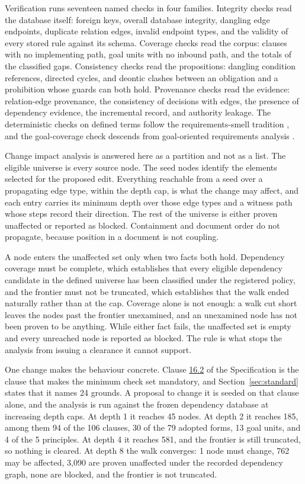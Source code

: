 Verification runs seventeen named checks in four families. Integrity checks read the database itself: foreign keys, overall database integrity, dangling edge endpoints, duplicate relation edges, invalid endpoint types, and the validity of every stored rule against its schema. Coverage checks read the corpus: clauses with no implementing path, goal units with no inbound path, and the totals of the classified gaps. Consistency checks read the propositions: dangling condition references, directed cycles, and deontic clashes between an obligation and a prohibition whose guards can both hold. Provenance checks read the evidence: relation-edge provenance, the consistency of decisions with edges, the presence of dependency evidence, the incremental record, and authority leakage. The deterministic checks on defined terms follow the requirements-smell tradition \citep{femmer2017}, and the goal-coverage check descends from goal-oriented requirements analysis \citep{vanlamsweerde2001}.

Change impact analysis \citep{kretsou2021} is answered here as a partition and not as a list. The eligible universe is every source node. The seed nodes identify the elements selected for the proposed edit. Everything reachable from a seed over a propagating edge type, within the depth cap, is what the change may affect, and each entry carries its minimum depth over those edge types and a witness path whose steps record their direction. The rest of the universe is either proven unaffected or reported as blocked. Containment and document order do not propagate, because position in a document is not coupling.

A node enters the unaffected set only when two facts both hold. Dependency coverage must be complete, which establishes that every eligible dependency candidate in the defined universe has been classified under the registered policy, and the frontier must not be truncated, which establishes that the walk ended naturally rather than at the cap. Coverage alone is not enough: a walk cut short leaves the nodes past the frontier unexamined, and an unexamined node has not been proven to be anything. While either fact fails, the unaffected set is empty and every unreached node is reported as blocked. The rule is what stops the analysis from issuing a clearance it cannot support.

One change makes the behaviour concrete. Clause \hyperlink{nss-16.2}{16.2} of the Specification is the clause that makes the minimum check set mandatory, and Section~\ref{sec:standard} states that it names 24 grounds. A proposal to change it is seeded on that clause alone, and the analysis is run against the frozen dependency database at increasing depth caps. At depth 1 it reaches 45 nodes. At depth 2 it reaches 185, among them 94 of the 106 clauses, 30 of the 79 adopted forms, 13 goal units, and 4 of the 5 principles. At depth 4 it reaches 581, and the frontier is still truncated, so nothing is cleared. At depth 8 the walk converges: 1 node must change, 762 may be affected, 3{,}090 are proven unaffected under the recorded dependency graph, none are blocked, and the frontier is not truncated.


